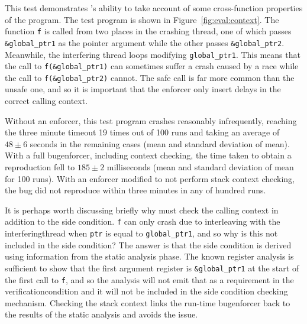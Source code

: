 This test demonstrates {\technique}'s ability to take account of some
cross-function properties of the program.  The test program is shown
in Figure~\ref{fig:eval:context}.  The function \texttt{f} is called
from two places in the crashing thread, one of which passes
\texttt{\&global\_ptr1} as the pointer argument while the other passes
\texttt{\&global\_ptr2}.  Meanwhile, the interfering thread loops
modifying \texttt{global\_ptr1}.  This means that the call to
\texttt{f(\&global\_ptr1)} can sometimes suffer a crash caused by a
race while the call to \texttt{f(\&global\_ptr2)} cannot.  The safe
call is far more common than the unsafe one, and so it is important
that the enforcer only insert delays in the correct calling context.

Without an enforcer, this test program crashes reasonably
infrequently, reaching the three minute timeout 19 times out of 100
runs and taking an average of $48 \pm 6$ seconds in the remaining
cases (mean and standard deviation of mean).  With a full
\gls{bugenforcer}, including context checking, the time taken to
obtain a reproduction fell to $185 \pm 2$ milliseconds (mean and
standard deviation of mean for 100 runs).  With an enforcer modified
to not perform stack context checking, the bug did not reproduce
within three minutes in any of hundred runs.

It is perhaps worth discussing briefly why {\technique} must check the
calling context in addition to the side condition.  \texttt{f} can
only crash due to interleaving with the \gls{interferingthread} when
\texttt{ptr} is equal to \texttt{global\_ptr1}, and so why is this not
included in the side condition?  The answer is that the side condition
is derived using information from the static analysis phase.  The
known register analysis is sufficient to show that the first argument
register is \texttt{\&global\_ptr1} at the start of the first call to
\texttt{f}, and so the analysis will not emit that as a requirement in
the \gls{verificationcondition} and it will not be included in the
side condition checking mechanism.  Checking the stack context links
the run-time \gls{bugenforcer} back to the results of the static
analysis and avoids the issue.
